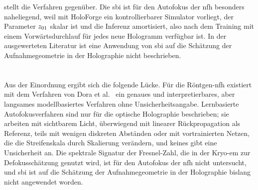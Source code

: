  stellt die Verfahren gegenüber. Die \ac{sbi}
ist für den Autofokus der \ac{nfh} besonders naheliegend, weil mit HoloForge
ein kontrollierbarer Simulator vorliegt, der Parameter $z_{01}$ skalar ist
und die Inferenz amortisiert, also nach dem Training mit einem
Vorwärtsdurchlauf für jedes neue Hologramm verfügbar ist. In der
ausgewerteten Literatur ist eine Anwendung von \ac{sbi} auf die Schätzung
der Aufnahmegeometrie in der Holographie nicht beschrieben.

\section{}
\label{sec:stand:abgrenzung}

Aus der Einordnung ergibt sich die folgende Lücke. Für die Röntgen-\ac{nfh}
existiert mit dem Verfahren von Dora et al.\ \cite{dora2025autofocus} ein genaues und interpretierbares,
aber langsames modellbasiertes Verfahren ohne Unsicherheitsangabe.
Lernbasierte Autofokusverfahren sind nur für die optische Holographie
beschrieben; sie arbeiten mit sichtbarem Licht, überwiegend mit linearer
Rückpropagation als Referenz, teils mit wenigen diskreten Abständen oder
mit vortrainierten Netzen, die die Streifenskala durch Skalierung verändern,
und keines gibt eine Unsicherheit an. Die spektrale Signatur der
Fresnel-Zahl, die in der Kryo-\ac{em} zur Defokusschätzung genutzt wird,
ist für den Autofokus der \ac{nfh} nicht untersucht, und \ac{sbi} ist auf
die Schätzung der Aufnahmegeometrie in der Holographie bislang nicht
angewendet worden.

